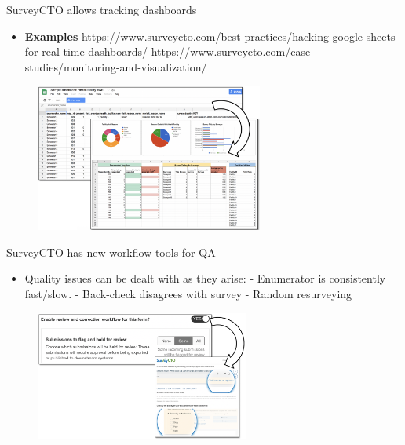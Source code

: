 \documentclass[aspectratio=169]{beamer}
\begin{document}
\begin{frame}[fragile]{SurveyCTO allows tracking dashboards}
\begin{multicols}{2}	
	
	\begin{itemize}[<default overlay specification>]
		\item<1> \textbf{Examples}
		https://www.surveycto.com/best-practices/hacking-google-sheets-for-real-time-dashboards/
		https://www.surveycto.com/case-studies/monitoring-and-visualization/ 
	\end{itemize}
	
	\begin{figure}
		\centering
		\includegraphics[width=75mm, right]{img/Dashboard}
	\end{figure}
	
\end{multicols}
\end{frame}


\begin{frame}[fragile]{SurveyCTO has new workflow tools for QA}
\begin{multicols}{2}	
	
	\begin{itemize}[<default overlay specification>]
		\item<1> Quality issues can be dealt with as they arise:
			\newline - Enumerator is consistently fast/slow.
			\newline - Back-check disagrees with survey
			\newline - Random resurveying
	\end{itemize}
	
	\begin{figure}
		\centering
		\includegraphics[width=70mm, right]{img/Workflow}
	\end{figure}
	
\end{multicols}
\end{frame}
\end{document}
